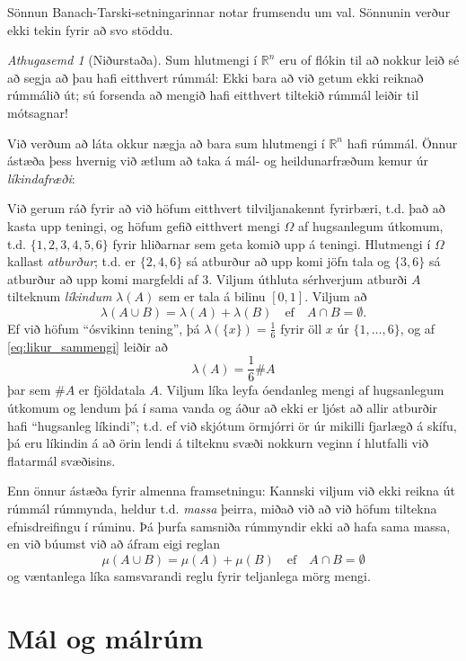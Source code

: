 \documentclass[a4paper,icelandic,11pt]{book}
\theoremstyle{plain}      \newtheorem{setn}{Setning}[chapter]
\theoremstyle{definition} \newtheorem{skilgr}[setn]{Skilgreining}
\theoremstyle{remark}     \newtheorem*{ath}{Athugasemd}
\newcommand{\R}{\mathbb R}
\begin{document}
Sönnun Banach-Tarski-setningarinnar notar frumsendu um val. Sönnunin
verður ekki tekin fyrir að svo stöddu.
\begin{ath} [Niðurstaða]
  Sum hlutmengi í $\R^{n}$ eru of flókin til að nokkur leið sé að
  segja að þau hafi eitthvert rúmmál: Ekki bara að við getum ekki
  reiknað rúmmálið út; sú forsenda að mengið hafi eitthvert tiltekið
  rúmmál leiðir til mótsagnar!
\end{ath}
Við verðum að láta okkur nægja að bara sum hlutmengi í $\R^{n}$ hafi
rúmmál. Önnur ástæða þess hvernig við ætlum að taka á mál- og
heildunarfræðum kemur úr
\emph{líkindafræði}:

Við gerum ráð fyrir að við höfum eitthvert tilviljanakennt fyrirbæri,
t.d. það að kasta upp teningi, og höfum gefið eitthvert mengi $\Omega$
af hugsanlegum útkomum, t.d. $\{1,2,3,4,5,6\}$ fyrir hliðarnar sem
geta komið upp á teningi. Hlutmengi í $\Omega$ kallast
\emph{atburður}; t.d. er $\{2,4,6\}$ sá
atburður að upp komi jöfn tala og $\{3,6\}$ sá atburður að upp komi
margfeldi af 3. Viljum úthluta sérhverjum atburði $A$ tilteknum
\emph{líkindum} $\lambda(A)$ sem er tala á
bilinu $\left[0,1\right]$. Viljum að
\begin{equation}
\lambda(A\cup B) = \lambda(A)+\lambda(B)
\quad\text{ef}\quad
A\cap B=\emptyset.\label{eq:likur_sammengi}
\end{equation}
Ef við höfum ``ósvikinn tening'', þá $\lambda(\{x\})=\frac16$ fyrir
öll $x$ úr $\{1,\dots,6\}$, og af \eqref{eq:likur_sammengi} leiðir
að
\[
\lambda(A) = \frac 16 \#A
\]
þar sem $\#A$ er fjöldatala $A$. Viljum líka leyfa óendanleg mengi af
hugsanlegum útkomum og lendum þá í sama vanda og áður að ekki er ljóst
að allir atburðir hafi ``hugsanleg líkindi''; t.d. ef við skjótum
örmjórri ör úr mikilli fjarlægð á skífu, þá eru líkindin á að örin
lendi á tilteknu svæði nokkurn veginn í hlutfalli við flatarmál
svæðisins.

Enn önnur ástæða fyrir almenna framsetningu: Kannski viljum við ekki
reikna út rúmmál rúmmynda, heldur t.d. \emph{massa} þeirra, miðað við
að við höfum tiltekna efnisdreifingu í rúminu. Þá þurfa samsniða
rúmmyndir ekki að hafa sama massa, en við búumst við að áfram eigi
reglan
\[
\mu(A\cup B) = \mu(A)+\mu(B)
\quad\text{ef}\quad
A\cap B = \emptyset
\]
og væntanlega líka samsvarandi reglu fyrir teljanlega mörg mengi.


\chapter{Mál og málrúm}
\end{document}
